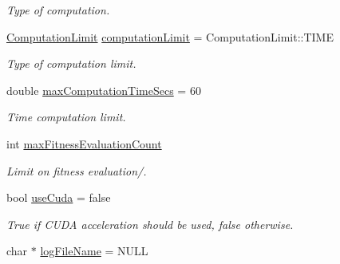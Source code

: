 \begin{DoxyCompactItemize}
\begin{DoxyCompactList}\small\item\em Type of computation. \end{DoxyCompactList}\item 
\hyperlink{classlossycompressor_1_1_compressor_aae4947e887bbd9773bd2ceb47363d4f1}{Computation\+Limit} \hyperlink{structlossycompressor_1_1_compressor_1_1_args_a2fd0894279a2a55e1b905f06f6545aac}{computation\+Limit} = Computation\+Limit\+::\+T\+I\+ME\hypertarget{structlossycompressor_1_1_compressor_1_1_args_a2fd0894279a2a55e1b905f06f6545aac}{}\label{structlossycompressor_1_1_compressor_1_1_args_a2fd0894279a2a55e1b905f06f6545aac}

\begin{DoxyCompactList}\small\item\em Type of computation limit. \end{DoxyCompactList}\item 
double \hyperlink{structlossycompressor_1_1_compressor_1_1_args_abf76291aa3631cf622dbefefad2c796c}{max\+Computation\+Time\+Secs} = 60\hypertarget{structlossycompressor_1_1_compressor_1_1_args_abf76291aa3631cf622dbefefad2c796c}{}\label{structlossycompressor_1_1_compressor_1_1_args_abf76291aa3631cf622dbefefad2c796c}

\begin{DoxyCompactList}\small\item\em Time computation limit. \end{DoxyCompactList}\item 
int \hyperlink{structlossycompressor_1_1_compressor_1_1_args_ab37df21b0593052f67e4244593def7d2}{max\+Fitness\+Evaluation\+Count}\hypertarget{structlossycompressor_1_1_compressor_1_1_args_ab37df21b0593052f67e4244593def7d2}{}\label{structlossycompressor_1_1_compressor_1_1_args_ab37df21b0593052f67e4244593def7d2}

\begin{DoxyCompactList}\small\item\em Limit on fitness evaluation/. \end{DoxyCompactList}\item 
bool \hyperlink{structlossycompressor_1_1_compressor_1_1_args_a9581f3e425fe29d33b9424176a9cde4d}{use\+Cuda} = false\hypertarget{structlossycompressor_1_1_compressor_1_1_args_a9581f3e425fe29d33b9424176a9cde4d}{}\label{structlossycompressor_1_1_compressor_1_1_args_a9581f3e425fe29d33b9424176a9cde4d}

\begin{DoxyCompactList}\small\item\em True if C\+U\+DA acceleration should be used, false otherwise. \end{DoxyCompactList}\item 
char $\ast$ \hyperlink{structlossycompressor_1_1_compressor_1_1_args_afc7c4a50ef9ce91ce0d9408f7de9e5e4}{log\+File\+Name} = N\+U\+LL\hypertarget{structlossycompressor_1_1_compressor_1_1_args_afc7c4a50ef9ce91ce0d9408f7de9e5e4}{}\label{structlossycompressor_1_1_compressor_1_1_args_afc7c4a50ef9ce91ce0d9408f7de9e5e4}


\end{DoxyCompactItemize}
